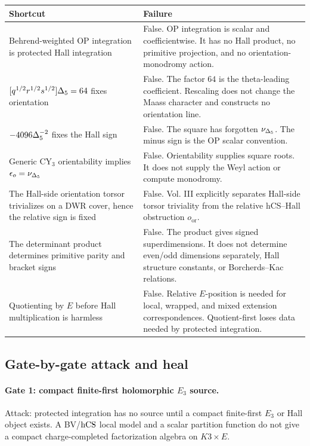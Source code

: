 \begin{center}
\small
\begin{tabular}{p{}p{}}
\hline
Shortcut & Failure \\
\hline
Behrend-weighted OP integration is protected Hall integration &
False.  OP integration is scalar and coefficientwise.  It has no Hall
product, no primitive projection, and no orientation-monodromy action. \\
\([q^{1/2}r^{1/2}s^{1/2}]\Delta_5=64\) fixes orientation &
False.  The factor \(64\) is the theta-leading coefficient.  Rescaling
does not change the Maass character and constructs no orientation line. \\
\(-4096\Delta_5^{-2}\) fixes the Hall sign &
False.  The square has forgotten \(\nu_{\Delta_5}\).  The minus sign is the
OP scalar convention. \\
Generic CY\(_3\) orientability implies \(\epsilon_o=\nu_{\Delta_5}\) &
False.  Orientability supplies square roots.  It does not supply the
Weyl action or compute monodromy. \\
The Hall-side orientation torsor trivializes on a DWR cover, hence the
relative sign is fixed &
False.  Vol. III explicitly separates Hall-side torsor triviality from
the relative hCS--Hall obstruction \(o_{\mathrm{or}}\). \\
The determinant product determines primitive parity and bracket signs &
False.  The product gives signed superdimensions.  It does not determine
even/odd dimensions separately, Hall structure constants, or
Borcherds--Kac relations. \\
Quotienting by \(E\) before Hall multiplication is harmless &
False.  Relative \(E\)-position is needed for local, wrapped, and mixed
extension correspondences.  Quotient-first loses data needed by
protected integration. \\
\hline
\end{tabular}
\end{center}

\subsection{Gate-by-gate attack and heal}

\paragraph{Gate 1: compact finite-first holomorphic \(E_3\) source.}
Attack: protected integration has no source until a compact
finite-first \(E_3\) or Hall object exists.  A BV/\(\mathrm{hCS}\) local model
and a scalar partition function do not give a compact charge-completed
factorization algebra on \(K3\times E\).

